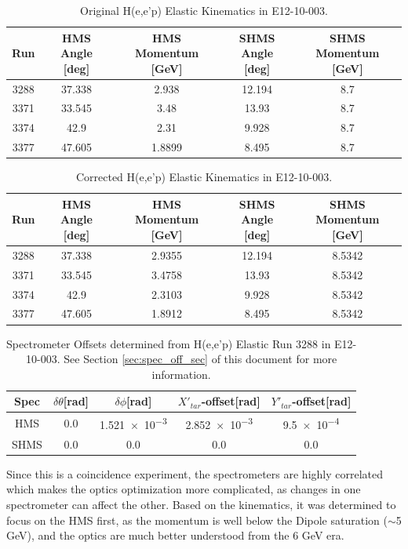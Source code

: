 \documentclass[11pt]{article}
\begin{document}
\begin{table}[ht]
\begin{tabular}{c c c c c}
\hline\hline
Run  & \shortstack{HMS \\ Angle [deg]} & \shortstack{HMS \\ Momentum [GeV]} & \shortstack{SHMS \\ Angle [deg]} & \shortstack{SHMS \\ Momentum [GeV]} \\
\hline
3288 & 37.338 & 2.938 & 12.194 & 8.7 \\
3371 & 33.545 & 3.48 & 13.93 & 8.7 \\
3374 & 42.9 & 2.31 & 9.928 & 8.7 \\
3377 & 47.605 & 1.8899 & 8.495 & 8.7 \\
\hline
\end{tabular}
\label{table:original_heep_kin}
\caption{Original H(e,e'p) Elastic Kinematics in E12-10-003.}
\end{table}
\begin{table}[ht]
\begin{tabular}{c c c c c}
\hline\hline
Run  & \shortstack{HMS \\ Angle [deg]} & \shortstack{HMS \\ Momentum [GeV]} & \shortstack{SHMS \\ Angle [deg]} & \shortstack{SHMS \\ Momentum [GeV]} \\
\hline
3288 & 37.338 & 2.9355 & 12.194 & 8.5342 \\
3371 & 33.545 & 3.4758 & 13.93 & 8.5342 \\
3374 & 42.9 & 2.3103 & 9.928 & 8.5342 \\
3377 & 47.605 & 1.8912 & 8.495 & 8.5342 \\
\hline
\end{tabular}
\label{table:corr_heep_kin}
\caption{Corrected H(e,e'p) Elastic Kinematics in E12-10-003.}
\end{table}
\begin{table}[ht]
\begin{tabular}{c c c c c}
\hline\hline
Spec  & $\delta\theta$[rad] & $\delta\phi$[rad] & $X'_{tar}$-offset[rad] & $Y'_{tar}$-offset[rad] \\
\hline
HMS & 0.0 & \num{1.521e-3} & \num{2.852e-3} & \num{9.5e-4} \\
SHMS & 0.0 & 0.0 & 0.0 & 0.0 \\
\hline
\end{tabular}
\label{table:spec_offsets}
\caption{Spectrometer Offsets determined from H(e,e'p) Elastic Run 3288 in E12-10-003. See Section \ref{sec:spec_off_sec} of this document for more information.}
\end{table}
Since this is a coincidence experiment, the spectrometers are highly correlated which makes the optics optimization more complicated, as changes in
one spectrometer can affect the other. Based on the kinematics, it was determined to focus on the HMS first, as the momentum is well below the Dipole
saturation ($\sim$5 GeV), and the optics are much better understood from the 6 GeV era.
\end{document}
